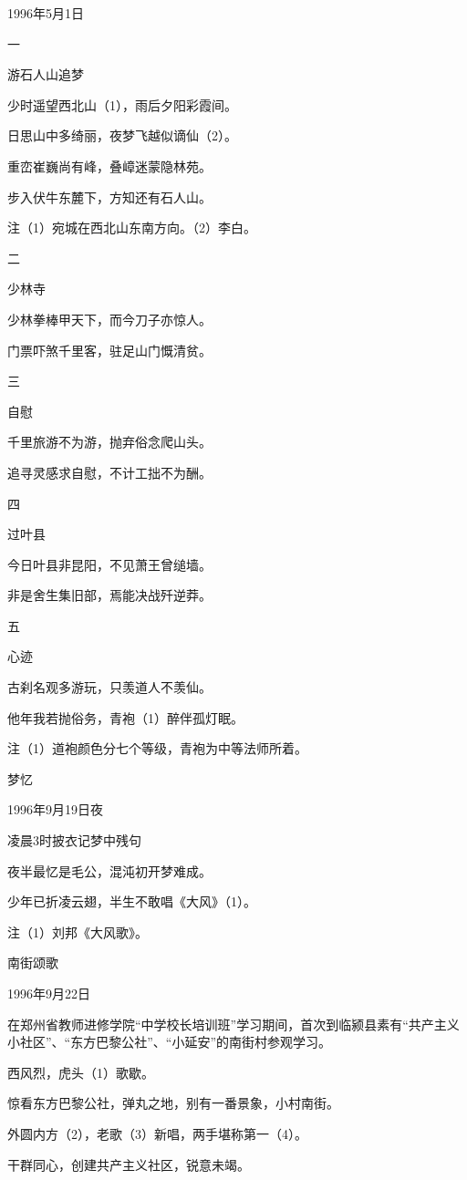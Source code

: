 \documentclass[../../dazhuan.tex]{subfiles}
\begin{document}
1996年5月1日

一

游石人山追梦

少时遥望西北山（1），雨后夕阳彩霞间。

日思山中多绮丽，夜梦飞越似谪仙（2）。

重峦崔巍尚有峰，叠嶂迷蒙隐林苑。

步入伏牛东麓下，方知还有石人山。

注（1）宛城在西北山东南方向。（2）李白。

二

少林寺

少林拳棒甲天下，而今刀子亦惊人。

门票吓煞千里客，驻足山门慨清贫。

三

自慰

千里旅游不为游，抛弃俗念爬山头。

追寻灵感求自慰，不计工拙不为酬。

四

过叶县

今日叶县非昆阳，不见萧王曾缒墙。

非是舍生集旧部，焉能决战歼逆莽。

五

心迹

古刹名观多游玩，只羡道人不羡仙。

他年我若抛俗务，青袍（1）醉伴孤灯眠。

注（1）道袍颜色分七个等级，青袍为中等法师所着。



梦忆

1996年9月19日夜

凌晨3时披衣记梦中残句

夜半最忆是毛公，混沌初开梦难成。

少年已折凌云翅，半生不敢唱《大风》（1）。

注（1）刘邦《大风歌》。



南街颂歌

1996年9月22日

在郑州省教师进修学院“中学校长培训班”学习期间，首次到临颍县素有“共产主义小社区”、“东方巴黎公社”、“小延安”的南街村参观学习。

西风烈，虎头（1）歌歇。

惊看东方巴黎公社，弹丸之地，别有一番景象，小村南街。

外圆内方（2），老歌（3）新唱，两手堪称第一（4）。

干群同心，创建共产主义社区，锐意未竭。
\end{document}
